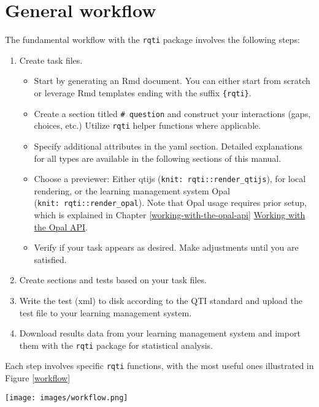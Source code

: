 \documentclass[twoside]{tufte-book}
\providecommand{\tightlist}{%
  \setlength{\itemsep}{0pt}\setlength{\parskip}{0pt}}
\begin{document}
\section{General workflow}\label{general-workflow}

The fundamental workflow with the \texttt{rqti} package involves the following steps:

\begin{enumerate}
\def\labelenumi{\arabic{enumi}.}
\tightlist
\item
  Create task files.

  \begin{itemize}
  \tightlist
  \item
    Start by generating an Rmd document. You can either start from scratch or leverage Rmd templates ending with the suffix \texttt{\{rqti\}}.
  \item
    Create a section titled \texttt{\#\ question} and construct your interactions (gaps, choices, etc.) Utilize \texttt{rqti} helper functions where applicable.
  \item
    Specify additional attributes in the yaml section. Detailed explanations for all types are available in the following sections of this manual.
  \item
    Choose a previewer: Either qtijs (\texttt{knit:\ rqti::render\_qtijs}), for local rendering, or the learning management system Opal (\texttt{knit:\ rqti::render\_opal}). Note that Opal usage requires prior setup, which is explained in Chapter \ref{working-with-the-opal-api} \href{Chapters/api_opal.html}{Working with the Opal API}.
  \item
    Verify if your task appears as desired. Make adjustments until you are satisfied.
  \end{itemize}
\item
  Create sections and tests based on your task files.
\item
  Write the test (xml) to disk according to the QTI standard and upload the test file to your learning management system.
\item
  Download results data from your learning management system and import them with the \texttt{rqti} package for statistical analysis.
\end{enumerate}

Each step involves specific \texttt{rqti} functions, with the most useful ones illustrated in Figure \ref{workflow}

\begin{figure*}
\centering
\texttt{[image: images/workflow.png]}
\caption{\label{workflow}Basic workflow to create tasks and tests with rqti}
\end{figure*}
\end{document}
